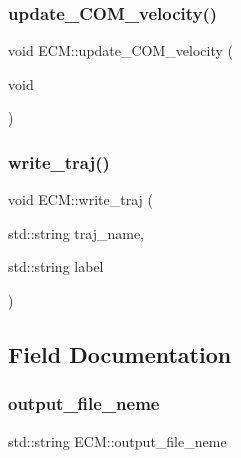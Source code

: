 \mbox{\label{classECM_a7272481293ee528878aeb669343bcd4f}} 
\subsubsection{\texorpdfstring{update\_COM\_velocity()}{update\_COM\_velocity()}}
{\footnotesize\ttfamily void E\+C\+M\+::update\+\_\+\+C\+O\+M\+\_\+velocity (\begin{DoxyParamCaption}\item[{void}]{ }\end{DoxyParamCaption})\hspace{0.3cm}{\ttfamily [inline]}}

\mbox{\label{classECM_acf7ff0e1b7a7631eff70c8584d01c050}} 
\subsubsection{\texorpdfstring{write\_traj()}{write\_traj()}}
{\footnotesize\ttfamily void E\+C\+M\+::write\+\_\+traj (\begin{DoxyParamCaption}\item[{std\+::string}]{traj\+\_\+name,  }\item[{std\+::string}]{label }\end{DoxyParamCaption})}



\subsection{Field Documentation}
\mbox{\label{classECM_a14bf2404f3c94c4e4e372c5eb9fd70cf}} 
\subsubsection{\texorpdfstring{output\_file\_neme}{output\_file\_neme}}
{\footnotesize\ttfamily std\+::string E\+C\+M\+::output\+\_\+file\+\_\+neme}




